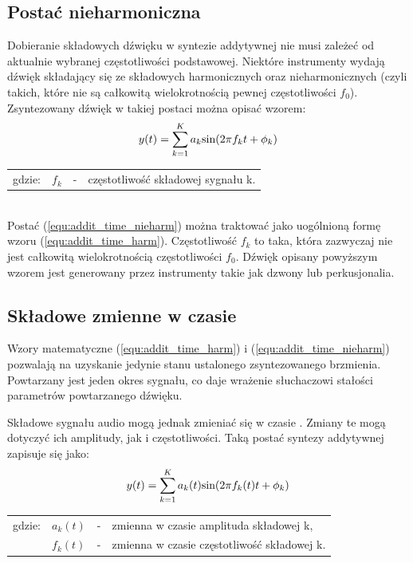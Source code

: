 \subsection{Postać nieharmoniczna} \label{pos_nieharm}
Dobieranie składowych dźwięku w syntezie addytywnej nie musi zależeć od aktualnie wybranej częstotliwości podstawowej. Niektóre instrumenty wydają dźwięk składający się ze składowych harmonicznych oraz nieharmonicznych (czyli takich, które nie są całkowitą wielokrotnością pewnej częstotliwości $f_{0}$). Zsyntezowany dźwięk w takiej postaci można opisać wzorem:
\begin{equation} \label{equ:addit_time_nieharm}
y(t) = \sum_{k=1}^{K} a_{k}\text{sin}(2\pi f_{k}t + \phi_{k})  \\  
\end{equation}
\begin{tabular}{ l l l l}
	gdzie: 	&	$f_{k}$ & - &  częstotliwość składowej sygnału k. \\
\end{tabular} \\

Postać (\ref{equ:addit_time_nieharm}) można traktować jako uogólnioną formę wzoru (\ref{equ:addit_time_harm}). Częstotliwość $f_k$ to taka, która zazwyczaj nie jest całkowitą wielokrotnością częstotliwości $f_0$. Dźwięk opisany powyższym wzorem jest generowany przez instrumenty takie jak dzwony lub perkusjonalia.

\subsection{Składowe zmienne w czasie}
Wzory matematyczne (\ref{equ:addit_time_harm}) i (\ref{equ:addit_time_nieharm}) pozwalają na uzyskanie jedynie stanu ustalonego zsyntezowanego brzmienia. Powtarzany jest jeden okres sygnału, co daje wrażenie słuchaczowi stałości parametrów powtarzanego dźwięku.

Składowe sygnału audio mogą jednak zmieniać się w czasie \cite{add_time_varying}. Zmiany te mogą dotyczyć ich amplitudy, jak i częstotliwości.
Taką postać syntezy addytywnej zapisuje się jako:
\begin{equation} \label{equ:addit_time_zmienne}
y(t) = \sum_{k=1}^{K} a_{k}(t)\text{sin}(2\pi f_{k}(t)t + \phi_{k})  \\  
\end{equation}
\begin{tabular}{ l l l l}
	gdzie: & $a_{k}(t)$ &  - & zmienna w czasie amplituda składowej k, \\
	&	$f_{k}(t)$ & - &  zmienna w czasie częstotliwość składowej k. \\
\end{tabular} \\

